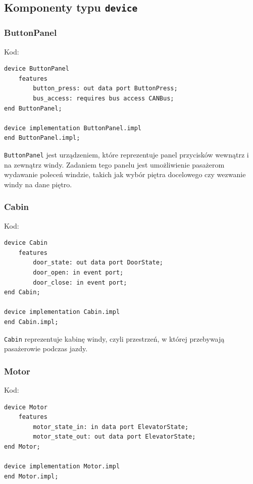 \documentclass{article}
\begin{document}
    \subsection{Komponenty typu \texttt{device}}

    
    \subsubsection{ButtonPanel}

    Kod:
    
    \begin{lstlisting}[basicstyle=\ttfamily, keywordstyle=\bfseries]
device ButtonPanel
    features
        button_press: out data port ButtonPress;
        bus_access: requires bus access CANBus;
end ButtonPanel;

device implementation ButtonPanel.impl
end ButtonPanel.impl;
    \end{lstlisting}

    \texttt{ButtonPanel} jest urządzeniem, które reprezentuje panel przycisków wewnątrz i na zewnątrz windy. Zadaniem tego panelu jest umożliwienie pasażerom wydawanie poleceń windzie, takich jak wybór piętra docelowego czy wezwanie windy na dane piętro.


    \subsubsection{Cabin}

    Kod:
    
    \begin{lstlisting}[basicstyle=\ttfamily, keywordstyle=\bfseries]
device Cabin
    features
        door_state: out data port DoorState;
        door_open: in event port;
        door_close: in event port;
end Cabin;

device implementation Cabin.impl
end Cabin.impl;
    \end{lstlisting}

    \texttt{Cabin} reprezentuje kabinę windy, czyli przestrzeń, w której przebywają pasażerowie podczas jazdy. 




    \subsubsection{Motor}

    Kod:
    
    \begin{lstlisting}[basicstyle=\ttfamily, keywordstyle=\bfseries]
device Motor
    features
        motor_state_in: in data port ElevatorState;
        motor_state_out: out data port ElevatorState;
end Motor;

device implementation Motor.impl
end Motor.impl;
    \end{lstlisting}
\end{document}
